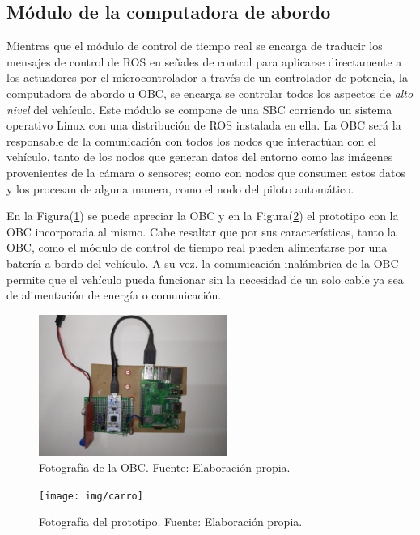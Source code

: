     \subsection{Módulo de la computadora de abordo}
    Mientras que el módulo de control de tiempo real se encarga de traducir los mensajes de control de ROS en señales de control 
    para aplicarse directamente a los actuadores por el microcontrolador a través de un controlador de potencia, la computadora 
    de abordo u OBC, se encarga se controlar todos los aspectos de \textit{alto nivel} del vehículo. Este módulo se compone de 
    una SBC corriendo un sistema operativo Linux con una distribución de ROS instalada en ella. La OBC será la responsable de 
    la comunicación con todos los nodos que interactúan con el vehículo, tanto  de los nodos que generan datos del entorno como 
    las imágenes provenientes de la cámara o sensores; como con nodos que consumen estos datos y los procesan de alguna manera, 
    como el nodo del piloto automático. 

    En la Figura(\ref{fig:obc}) se puede apreciar la OBC y en la Figura(\ref{fig:carro}) el prototipo con la OBC incorporada al mismo. Cabe resaltar que por sus características, tanto 
    la OBC, como el módulo de control de tiempo real pueden alimentarse por una batería a bordo del vehículo. A su vez, la comunicación 
    inalámbrica de la OBC permite que el vehículo pueda funcionar sin la necesidad de un solo cable ya sea de alimentación de energía 
    o comunicación.

    \begin{figure}[!h] 
        \centering
        \includegraphics[width=0.55\textwidth]{img/obc}
        \caption[Fotografía de la OBC]{Fotografía de la OBC. Fuente: Elaboración propia. }
        \label{fig:obc}
    \end{figure}

    \begin{figure}[!h] 
        \centering
        \texttt{[image: img/carro]}
        \caption[Fotografía del prototipo]{Fotografía del prototipo. Fuente: Elaboración propia. }
        \label{fig:carro}
    \end{figure}


